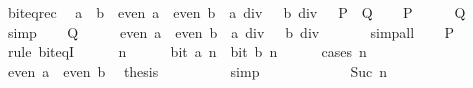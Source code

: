 \begin{isabellebody}
\ bit{\isacharunderscore}{\kern0pt}eq{\isacharunderscore}{\kern0pt}rec{\isacharcolon}{\kern0pt}\isanewline
\ \ {\isacartoucheopen}a\ {\isacharequal}{\kern0pt}\ b\ {\isasymlongleftrightarrow}\ {\isacharparenleft}{\kern0pt}even\ a\ {\isasymlongleftrightarrow}\ even\ b{\isacharparenright}{\kern0pt}\ {\isasymand}\ a\ div\ {}\ {\isacharequal}{\kern0pt}\ b\ div\ {}{\isacartoucheclose}\ {\isacharparenleft}{\kern0pt}\ {\isacartoucheopen}{\isacharquery}{\kern0pt}P\ {\isacharequal}{\kern0pt}\ {\isacharquery}{\kern0pt}Q{\isacartoucheclose}{\isacharparenright}{\kern0pt}\isanewline
%
\isadelimproof
%
\endisadelimproof
%
\isatagproof
{}\isamarkupfalse%
\isanewline
\ \ \isamarkupfalse%
\ {\isacharquery}{\kern0pt}P\isanewline
\ \ \isamarkupfalse%
\ \isamarkupfalse%
\ {\isacharquery}{\kern0pt}Q\isanewline
\ \ \ \ \isamarkupfalse%
\ simp\isanewline
{}\isamarkupfalse%
\isanewline
\ \ \isamarkupfalse%
\ {\isacharquery}{\kern0pt}Q\isanewline
\ \ \isamarkupfalse%
\ \isamarkupfalse%
\ {\isacartoucheopen}even\ a\ {\isasymlongleftrightarrow}\ even\ b{\isacartoucheclose}\ \ {\isacartoucheopen}a\ div\ {}\ {\isacharequal}{\kern0pt}\ b\ div\ {}{\isacartoucheclose}\isanewline
\ \ \ \ \isamarkupfalse%
\ simp{\isacharunderscore}{\kern0pt}all\isanewline
\ \ \isamarkupfalse%
\ {\isacharquery}{\kern0pt}P\isanewline
\ \ \isamarkupfalse%
\ {\isacharparenleft}{\kern0pt}rule\ bit{\isacharunderscore}{\kern0pt}eqI{\isacharparenright}{\kern0pt}\isanewline
\ \ \ \ \isamarkupfalse%
\ n\isanewline
\ \ \ \ \isamarkupfalse%
\ {\isacartoucheopen}bit\ a\ n\ {\isasymlongleftrightarrow}\ bit\ b\ n{\isacartoucheclose}\isanewline
\ \ \ \ \isamarkupfalse%
\ {\isacharparenleft}{\kern0pt}cases\ n{\isacharparenright}{\kern0pt}\isanewline
\ \ \ \ \ \ \isamarkupfalse%
\ {}\isanewline
\ \ \ \ \ \ \isamarkupfalse%
\ {\isacartoucheopen}even\ a\ {\isasymlongleftrightarrow}\ even\ b{\isacartoucheclose}\ \isamarkupfalse%
\ {\isacharquery}{\kern0pt}thesis\isanewline
\ \ \ \ \ \ \ \ \isamarkupfalse%
\ simp\isanewline
\ \ \ \ \isamarkupfalse%
\isanewline
\ \ \ \ \ \ \isamarkupfalse%
\ {\isacharparenleft}{\kern0pt}Suc\ n{\isacharparenright}{\kern0pt}\isanewline
\ \ \ \ \ \ \isamarkupfalse%

\end{isabellebody}
